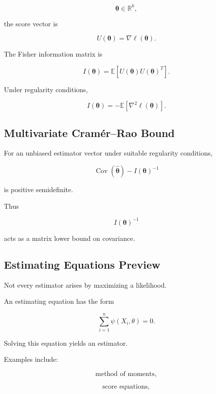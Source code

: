 \[
\boldsymbol{\theta}\in\mathbb{R}^k,
\]

the score vector is

\[
U(\boldsymbol{\theta})
=
\nabla
\ell(\boldsymbol{\theta}).
\]

The Fisher information matrix is

\[
\boxed{
I(\boldsymbol{\theta})
=
\mathbb{E}
[
U(\boldsymbol{\theta})
U(\boldsymbol{\theta})^T
].
}
\]

Under regularity conditions,

\[
\boxed{
I(\boldsymbol{\theta})
=
-
\mathbb{E}
[
\nabla^2
\ell(\boldsymbol{\theta})
].
}
\]

\subsection{Multivariate Cramér--Rao Bound}
\label{subsec:multivariate-cramer-rao}

For an unbiased estimator vector under suitable regularity conditions,

\[
\boxed{
\operatorname{Cov}
(
\widehat{\boldsymbol{\theta}}
)
-
I(\boldsymbol{\theta})^{-1}
}
\]

is positive semidefinite.

Thus

\[
\boxed{
I(\boldsymbol{\theta})^{-1}
}
\]

acts as a matrix lower bound on covariance.

\subsection{Estimating Equations Preview}
\label{subsec:estimating-equations-preview}

Not every estimator arises by maximizing a likelihood.

An estimating equation has the form

\[
\boxed{
\sum_{i=1}^{n}
\psi
(
X_i,\theta
)
=
0.
}
\]

Solving this equation yields an estimator.

Examples include:

\[
\boxed{
\text{method of moments},
}
\]

\[
\boxed{
\text{score equations},
}
\]

